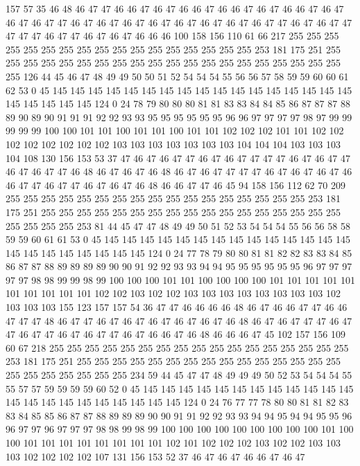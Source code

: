 157 57 35 46 48 46 47 47 46 46 47 46 47 46 46 47 46 46 47 46
47 46 46 47 46 47 46 47 46 47 47 46 47 46 47 46 47 46 47 46
47 46 47 46 47 46 47 47 46 47 46 47 47 47 47 47 46 47 47 46
47 46 47 46 46 46 100 158 156 110 61 66 217 255 255 255 255 255 255 255
255 255 255 255 255 255 255 255 255 255 253 181 175 251 255 255 255 255 255 255
255 255 255 255 255 255 255 255 255 255 255 255 255 255 255 126 44 45 46 47
48 49 49 50 50 51 52 54 54 54 55 56 56 57 58 59 59 60 60 61
62 53 0 45 145 145 145 145 145 145 145 145 145 145 145 145 145 145 145 145
145 145 145 145 145 145 124 0 24 78 79 80 80 80 81 81 83 83 84 84
85 86 87 87 87 88 89 90 89 90 91 91 91 92 92 93 93 95 95 95
95 95 95 96 96 97 97 97 97 98 97 99 99 99 99 99 100 100 101 101
100 101 101 100 101 101 102 102 102 101 101 102 102 102 102 102 102 102 102 103
103 103 103 103 103 103 104 104 104 103 103 103 104 108 130 156 153 53 37 47
46 47 46 47 47 46 47 46 47 47 47 47 46 47 46 47 47 46 47 46
47 47 46 48 46 47 46 47 46 48 46 47 46 47 47 47 47 46 47 46
47 46 47 46 46 47 47 46 47 47 46 47 46 47 46 48 46 46 47 47
46 45 94 158 156 112 62 70 209 255 255 255 255 255 255 255 255 255 255 255
255 255 255 255 255 255 253 181 175 251 255 255 255 255 255 255 255 255 255 255
255 255 255 255 255 255 255 255 255 255 255 253 81 44 45 47 47 48 49 49
50 51 52 53 54 54 54 55 56 56 58 58 59 59 60 61 61 53 0 45
145 145 145 145 145 145 145 145 145 145 145 145 145 145 145 145 145 145 145 145
145 145 124 0 24 77 78 79 80 80 81 81 82 82 83 83 84 85 86 87
87 88 89 89 89 89 90 90 91 92 92 93 93 94 94 95 95 95 95 95
95 96 97 97 97 97 97 98 98 99 99 98 99 100 100 100 101 101 100 100
100 100 101 101 101 101 101 101 101 101 101 101 102 102 103 102 102 103 103 103
103 103 103 103 103 102 103 103 103 155 123 157 157 54 36 47 47 46 46 46
46 48 46 47 46 46 47 47 46 46 47 47 47 48 46 47 47 46 47 46
47 46 47 46 47 46 47 46 48 46 47 46 47 47 47 46 47 47 46 47
47 46 47 46 47 47 46 47 46 46 47 46 48 46 46 46 47 45 102 157
156 109 60 67 218 255 255 255 255 255 255 255 255 255 255 255 255 255 255 255
255 255 253 181 175 251 255 255 255 255 255 255 255 255 255 255 255 255 255 255
255 255 255 255 255 255 255 255 234 59 44 45 47 47 48 49 49 49 50 52
53 54 54 54 55 55 57 57 59 59 59 59 60 52 0 45 145 145 145 145
145 145 145 145 145 145 145 145 145 145 145 145 145 145 145 145 145 145 124 0
24 76 77 77 78 80 80 81 81 82 83 83 84 85 85 86 87 87 88 89
89 89 90 90 91 91 92 92 93 93 94 94 95 94 94 95 95 96 96 97
97 96 97 97 97 98 98 99 98 99 100 100 100 100 100 100 100 100 100 101
100 100 101 101 101 101 101 101 101 101 102 101 102 102 102 103 102 102 103 103
103 102 102 102 102 107 131 156 153 52 37 46 47 46 47 46 46 47 46 47
